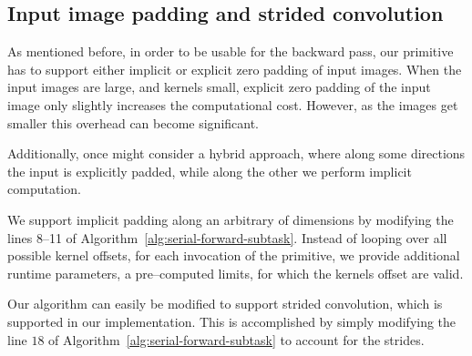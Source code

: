   \subsection{Input image padding and strided convolution}

  As mentioned before, in order to be usable for the backward pass,
  our primitive has to support either implicit or explicit zero
  padding of input images.  When the input images are large, and
  kernels small, explicit zero padding of the input image only
  slightly increases the computational cost.  However, as the images
  get smaller this overhead can become significant.

  Additionally, once might consider a hybrid approach, where along
  some directions the input is explicitly padded, while along the
  other we perform implicit computation.

  We support implicit padding along an arbitrary of dimensions by
  modifying the lines 8--11 of
  Algorithm~\ref{alg:serial-forward-subtask}.  Instead of looping over
  all possible kernel offsets, for each invocation of the primitive,
  we provide additional runtime parameters, a pre--computed limits,
  for which the kernels offset are valid.

  Our algorithm can easily be modified to support strided convolution,
  which is supported in our implementation.  This is accomplished by
  simply modifying the line $18$ of
  Algorithm~\ref{alg:serial-forward-subtask} to account for the
  strides.
